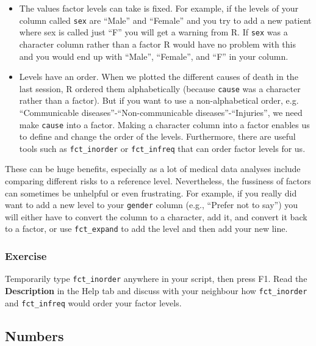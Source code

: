 \documentclass[]{book}
\providecommand{\tightlist}{%
  \setlength{\itemsep}{0pt}\setlength{\parskip}{0pt}}
\theoremstyle{definition}
\theoremstyle{definition}
\theoremstyle{definition}
\theoremstyle{remark}
\begin{document}
\begin{itemize}
\tightlist
\item
  The values factor levels can take is fixed. For example, if the levels
  of your column called \texttt{sex} are ``Male'' and ``Female'' and you
  try to add a new patient where sex is called just ``F'' you will get a
  warning from R. If \texttt{sex} was a character column rather than a
  factor R would have no problem with this and you would end up with
  ``Male'', ``Female'', and ``F'' in your column.
\item
  Levels have an order. When we plotted the different causes of death in
  the last session, R ordered them alphabetically (because
  \texttt{cause} was a character rather than a factor). But if you want
  to use a non-alphabetical order, e.g. ``Communicable
  diseases''-``Non-communicable diseases''-``Injuries'', we need make
  \texttt{cause} into a factor. Making a character column into a factor
  enables us to define and change the order of the levels. Furthermore,
  there are useful tools such as \texttt{fct\_inorder} or
  \texttt{fct\_infreq} that can order factor levels for us.
\end{itemize}

These can be huge benefits, especially as a lot of medical data analyses
include comparing different risks to a reference level. Nevertheless,
the fussiness of factors can sometimes be unhelpful or even frustrating.
For example, if you really did want to add a new level to your
\texttt{gender} column (e.g., ``Prefer not to say'') you will either
have to convert the column to a character, add it, and convert it back
to a factor, or use \texttt{fct\_expand} to add the level and then add
your new line.

\hypertarget{exercise-6}{%
\subsubsection{Exercise}\label{exercise-6}}

Temporarily type \texttt{fct\_inorder} anywhere in your script, then
press F1. Read the \textbf{Description} in the Help tab and discuss with
your neighbour how \texttt{fct\_inorder} and \texttt{fct\_infreq} would
order your factor levels.

\hypertarget{numbers}{%
\subsection{Numbers}\label{numbers}}
\end{document}
